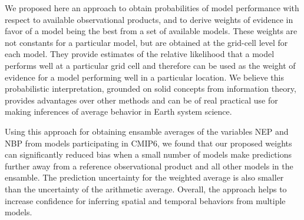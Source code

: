 \documentclass[gmd, manuscript]{copernicus}
\begin{document}
\conclusions  %
We proposed here an approach to obtain probabilities of model performance with respect to available observational products, and to derive weights of evidence in favor of a model being the best from a set of available models. These weights are not constants for a particular model, but are obtained at the grid-cell level for each model. They provide estimates of the relative likelihood that a model performs well at a particular grid cell and therefore can be used as the weight of evidence for a model performing well in a particular location. We believe this probabilistic interpretation, grounded on solid concepts from information theory, provides advantages over other methods and can be of real practical use for making inferences of average behavior in Earth system science. 

Using this approach for obtaining ensamble averages of the variables NEP and NBP from models participating in CMIP6, we found that our proposed weights can significantly reduced bias when a small number of models make predictions further away from a reference observational product and all other models in the ensamble. The prediction uncertainty for the weighted average is also smaller than the uncertainty of the arithmetic average. Overall, the approach helps to increase confidence for inferring spatial and temporal behaviors from multiple models.











\end{document}
